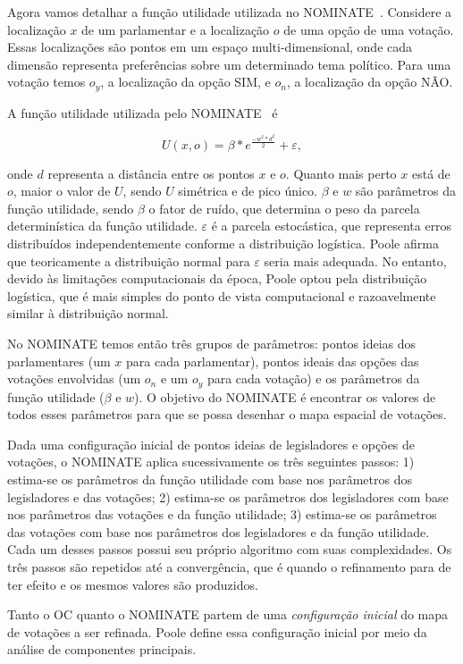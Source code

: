 \documentclass[a4paper, 12pt]{article}
\newcommand\nay{NÃO\xspace}
\newcommand\yea{SIM\xspace}
\newcommand\nominate{NOMINATE\xspace}
\begin{document}
Agora vamos detalhar a função utilidade utilizada no \nominate~\cite{poole1985nominate}. Considere a localização $x$ de um parlamentar e a localização $o$ de uma opção de uma votação. Essas localizações são pontos em um espaço multi-dimensional, onde cada dimensão representa preferências sobre um determinado tema político. Para uma votação temos $o_y$, a localização da opção \yea, e $o_n$, a localização da opção \nay. 

A função utilidade utilizada pelo \nominate~\cite{poole1985nominate} é 

\[ U(x,o) = \beta * e^{\frac{-w^2*d^2}{2}} + \varepsilon,\] 

\noindent
onde $d$ representa a distância entre os pontos $x$ e $o$. Quanto mais perto $x$ está de $o$, maior o valor de $U$, sendo $U$ simétrica e de pico único. $\beta$ e $w$ são parâmetros da função utilidade, sendo $\beta$ o fator de ruído, que determina o peso da parcela determinística da função utilidade. $\varepsilon$ é a parcela estocástica, que representa erros distribuídos independentemente conforme a distribuição logística. Poole afirma que teoricamente a distribuição normal para $\varepsilon$ seria mais adequada. No entanto, devido às limitações computacionais da época, Poole optou pela distribuição logística, que é mais simples do ponto de vista computacional e razoavelmente similar à distribuição normal.

No \nominate temos então três grupos de parâmetros: pontos ideias dos parlamentares (um $x$ para cada parlamentar), pontos ideais das opções das votações envolvidas (um $o_n$ e um $o_y$ para cada votação) e os parâmetros da função utilidade ($\beta$ e $w$). O objetivo do \nominate é encontrar os valores de todos esses parâmetros para que se possa desenhar o mapa espacial de votações.

Dada uma configuração inicial de pontos ideias de legisladores e opções de votações, o \nominate aplica sucessivamente os três seguintes passos: 1) estima-se os parâmetros da função utilidade com base nos parâmetros dos legisladores e das votações; 2) estima-se os parâmetros dos legisladores com base nos parâmetros das votações e da função utilidade; 3) estima-se os parâmetros das votações com base nos parâmetros dos legisladores e da função utilidade. Cada um desses passos possui seu próprio algoritmo com suas complexidades. Os três passos são repetidos até a convergência, que é quando o refinamento para de ter efeito e os mesmos valores são produzidos.

Tanto o OC quanto o \nominate partem de uma \emph{configuração inicial} do mapa de votações a ser refinada. Poole define essa configuração inicial por meio da análise de componentes principais.
\end{document}
